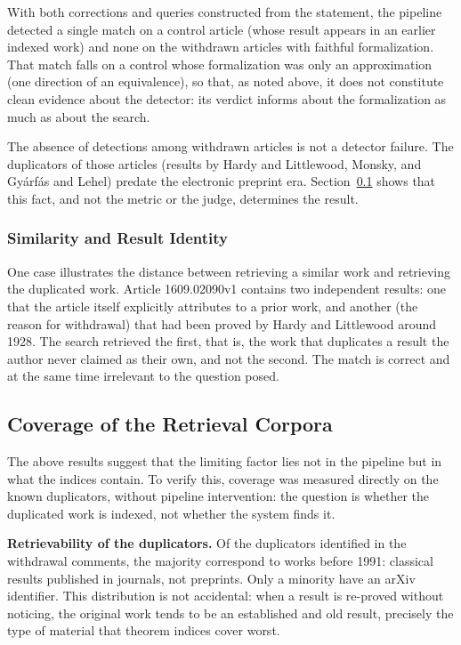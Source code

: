 \documentclass{article}
\theoremstyle{remark}
\begin{document}
With both corrections and queries constructed from the statement, the pipeline detected a single match on a control article (whose result appears in an earlier indexed work) and none on the withdrawn articles with faithful formalization. That match falls on a control whose formalization was only an approximation (one direction of an equivalence), so that, as noted above, it does not constitute clean evidence about the detector: its verdict informs about the formalization as much as about the search.

The absence of detections among withdrawn articles is not a detector failure. The duplicators of those articles (results by Hardy and Littlewood, Monsky, and Gyárfás and Lehel) predate the electronic preprint era. Section~\ref{ssec:cobertura} shows that this fact, and not the metric or the judge, determines the result.

\subsubsection{Similarity and Result Identity}

One case illustrates the distance between retrieving a similar work and retrieving the duplicated work. Article 1609.02090v1 contains two independent results: one that the article itself explicitly attributes to a prior work, and another (the reason for withdrawal) that had been proved by Hardy and Littlewood around 1928. The search retrieved the first, that is, the work that duplicates a result the author never claimed as their own, and not the second. The match is correct and at the same time irrelevant to the question posed.

\subsection{Coverage of the Retrieval Corpora}
\label{ssec:cobertura}

The above results suggest that the limiting factor lies not in the pipeline but in what the indices contain. To verify this, coverage was measured directly on the known duplicators, without pipeline intervention: the question is whether the duplicated work is indexed, not whether the system finds it.

\textbf{Retrievability of the duplicators.} Of the duplicators identified in the withdrawal comments, the majority correspond to works before 1991: classical results published in journals, not preprints. Only a minority have an arXiv identifier. This distribution is not accidental: when a result is re-proved without noticing, the original work tends to be an established and old result, precisely the type of material that theorem indices cover worst.
\end{document}
